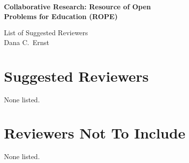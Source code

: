\documentclass[11pt]{article}
\begin{document}
\begin{center}
{\Large \textbf{Collaborative Research: Resource of Open\\
Problems for Education (ROPE)}}

\bigskip

{\Large List of Suggested Reviewers}\\
\smallskip
Dana C.~Ernst
\end{center}

\section{Suggested Reviewers}

None listed.

\section{Reviewers Not To Include}

None listed.
\end{document}
